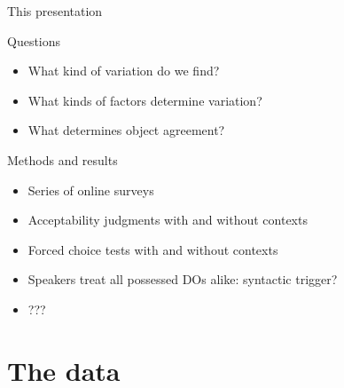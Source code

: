 \documentclass[12pt]{beamer}
\begin{document}
\begin{frame}{This presentation}

    \begin{block}{Questions}

        \begin{itemize}

        \item What kind of variation do we find?

        \item What kinds of factors determine variation?

        \item What determines object agreement?

        \end{itemize}

    \end{block}

    \begin{block}{Methods and results}

        \begin{itemize}

            \item Series of online surveys

            \item Acceptability judgments with and without contexts

            \item Forced choice tests with and without contexts

            \item Speakers treat all possessed DOs alike: \alert{syntactic} trigger?

            \item {}???

        \end{itemize}
    \end{block}

\end{frame}

\section{The data}
\end{document}
